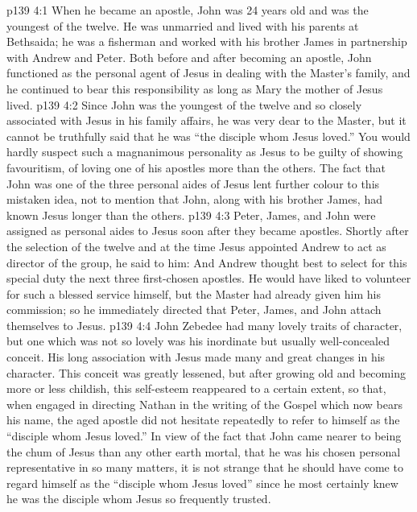 \vs p139 4:1 When he became an apostle, John was 24 years old and was the youngest of the twelve. He was unmarried and lived with his parents at Bethsaida; he was a fisherman and worked with his brother James in partnership with Andrew and Peter. Both before and after becoming an apostle, John functioned as the personal agent of Jesus in dealing with the Master’s family, and he continued to bear this responsibility as long as Mary the mother of Jesus lived.
\vs p139 4:2 Since John was the youngest of the twelve and so closely associated with Jesus in his family affairs, he was very dear to the Master, but it cannot be truthfully said that he was “the disciple whom Jesus loved.” You would hardly suspect such a magnanimous personality as Jesus to be guilty of showing favouritism, of loving one of his apostles more than the others. The fact that John was one of the three personal aides of Jesus lent further colour to this mistaken idea, not to mention that John, along with his brother James, had known Jesus longer than the others.
\vs p139 4:3 \pc Peter, James, and John were assigned as personal aides to Jesus soon after they became apostles. Shortly after the selection of the twelve and at the time Jesus appointed Andrew to act as director of the group, he said to him:  And Andrew thought best to select for this special duty the next three first\hyp{}chosen apostles. He would have liked to volunteer for such a blessed service himself, but the Master had already given him his commission; so he immediately directed that Peter, James, and John attach themselves to Jesus.
\vs p139 4:4 \pc John Zebedee had many lovely traits of character, but one which was not so lovely was his inordinate but usually well\hyp{}concealed conceit. His long association with Jesus made many and great changes in his character. This conceit was greatly lessened, but after growing old and becoming more or less childish, this self\hyp{}esteem reappeared to a certain extent, so that, when engaged in directing Nathan in the writing of the Gospel which now bears his name, the aged apostle did not hesitate repeatedly to refer to himself as the “disciple whom Jesus loved.” In view of the fact that John came nearer to being the chum of Jesus than any other earth mortal, that he was his chosen personal representative in so many matters, it is not strange that he should have come to regard himself as the “disciple whom Jesus loved” since he most certainly knew he was the disciple whom Jesus so frequently trusted.
